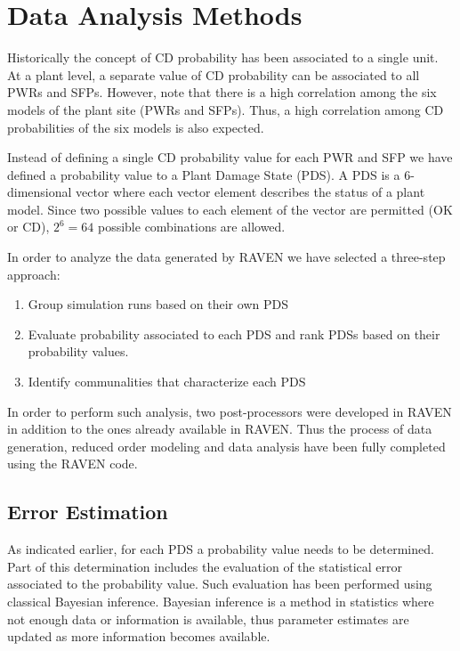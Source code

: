 \section{Data Analysis Methods}
\label{sec:plantAnalysisResults}

Historically the concept of CD probability has been  
associated to a single unit. At a plant level, a separate value of CD 
probability can be associated to all PWRs and SFPs. However, note that there 
is a high correlation among the six models of the plant site (PWRs and SFPs). 
Thus, a high correlation among CD probabilities of the six models is also expected.

Instead of defining a single CD probability value for each PWR and SFP 
we have defined a probability value to a Plant Damage State (PDS). 
A PDS is a $6$-dimensional vector where each vector element describes the 
status of a plant model. Since two possible 
values to each element of the vector are permitted (OK or CD), $2^6=64$ possible 
combinations are allowed.

In order to analyze the data generated by RAVEN we have selected a three-step 
approach:
\begin{enumerate}
  \item Group simulation runs based on their own PDS  
  \item Evaluate probability associated to each PDS and rank PDSs based on 
        their probability values.
  \item Identify communalities that characterize each PDS
\end{enumerate}

In order to perform such analysis, two post-processors were developed in RAVEN in 
addition to the ones already available in RAVEN.
Thus the process of data generation, reduced order modeling and data analysis 
have been fully completed using the RAVEN code.

\subsection{Error Estimation}
As indicated earlier, for each PDS a probability value needs to be 
determined. Part of this determination includes the evaluation of the statistical error
associated to the probability value. Such evaluation has been performed using classical
Bayesian inference.
Bayesian inference is a method in statistics where not enough data or information is 
available, thus parameter estimates are updated as more information becomes available. 

